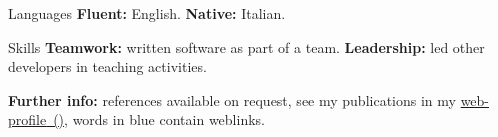 
\begin{cvskills}

\cvskill
{Languages}
{\textbf{Fluent:} English. \textbf{Native:} Italian.}

\cvskill
{Skills}
{\textbf{Teamwork:} written software as part of a team. \textbf{Leadership:} 
led other developers in teaching activities.}

\end{cvskills}

\flushleft
\footnotesize
\item {\color{awesome-red}\textbf{Fur}}{\color{awesome-darknight}\textbf{ther 
info:}} references available on request, see my publications in my 
{\href{https://www.ncl.ac.uk/engineering/staff/profile/alessandrode-gennaro.html}{{\color{myblue}web-profile}~(\profLogo\hspace{-0.8mm})}},
words in {\color{myblue}blue} contain weblinks.
